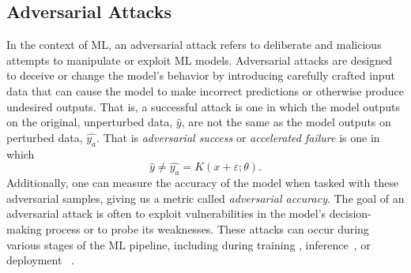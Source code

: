 \documentclass[conference]{IEEEtran}
\newcommand{\cm}[1]{\textit{{\color{blue}#1}}}
\begin{document}
\subsection{Adversarial Attacks}
\label{attacks}
In the context of ML, an adversarial attack refers to deliberate and malicious attempts to manipulate or exploit ML models. Adversarial attacks are designed to deceive or change the model's behavior by introducing carefully crafted input data that can cause the model to make incorrect predictions or otherwise produce undesired outputs. That is, a successful attack is one in which the model outputs on the original, unperturbed data, $\hat{y}$, are not the same as the model outputs on perturbed data, $\hat{y_a}$. That is \textit{adversarial success} or \textit{accelerated failure} is one in which
\begin{equation}
    \hat{y} \neq \hat{y_a} = K(x + \varepsilon; \theta).
\label{eq:adv_success}
\end{equation}
Additionally, one can measure the accuracy of the model when tasked with these adversarial samples, giving us a metric called \textit{adversarial accuracy}. The goal of an adversarial attack is often to exploit vulnerabilities in the model's decision-making process or to probe its weaknesses. These attacks can occur during various stages of the ML pipeline, including during training \cite{biggio_poisoning_2013, saha2020hidden}, inference~\cite{chakraborty_adversarial_2018, orekondy2019knockoff}, or deployment ~\cite{chakraborty_adversarial_2018, choquette2021label, li2021membership, carlini_towards_2017, adversarialpatch, pixelattack, hopskipjump}.

\end{document}
